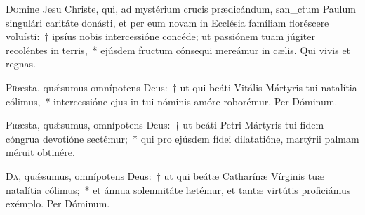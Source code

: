 \documentclass[vesperale_romanum.tex]{subfiles}
\begin{document}

\duplexmtv

\oratio

\lettrine{D}{o}mine Jesu Christe, qui, ad mystérium crucis prædicándum, san\_ctum Paulum singulári caritáte donásti, et per eum novam in Ecclésia famíliam floréscere voluísti:~† ipsíus nobis intercessióne concéde; ut passiónem tuam júgiter recoléntes in terris,~* ejúsdem fru\-ctum cónsequi mereámur in cælis.
Qui vivis et regnas.


\oratio

\lettrine{P}{r}æsta, quǽsumus omnípotens Deus:~† ut qui beáti Vitális Mártyris tui natalítia cólimus,~* intercessióne ejus in tui nóminis amóre roborémur. Per Dóminum.

\capitdeseq

\myrule


\duplex

\oratio
 \lettrine{P}{r}æsta, quǽsumus, omnípotens Deus:~† ut beáti Petri Mártyris tui fidem cóngrua devotióne sectémur;~* qui pro ejúsdem fídei dilatatióne, martýrii palmam méruit obtinére.
   
   \capitdeseq   
\myrule


\duplex

\oratio

\lettrine{D}{a}, quǽsumus, omnípotens Deus:~† ut qui beátæ Catharínæ Vírginis tuæ natalítia cólimus;~* et ánnua sole\-mnitáte lætémur, et tantæ virtútis proficiámus exémplo.
Per Dóminum.



\myrule

\newpage


\end{document}
